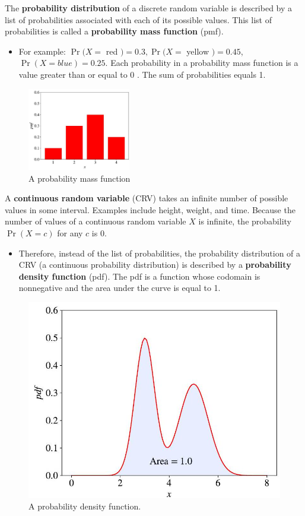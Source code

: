 \documentclass[9pt,dvipsnames]{beamer}
\begin{document}
\begin{frame}
	The \textbf{probability distribution} of a discrete random variable is described by a list of probabilities associated with each of its possible values. This list of probabilities is called a \textbf{probability mass function} (pmf).
	\begin{itemize}
		\item For example: $\operatorname{Pr}(X=$ red $)=0.3, \operatorname{Pr}(X=$ yellow $)=0.45$, $\operatorname{Pr}(X=b l u e)=0.25$. Each probability in a probability mass function is a value greater than or equal to 0 . The sum of probabilities equals 1.
	\end{itemize}

	\begin{figure}
		\centering
		\includegraphics[width=0.4\textwidth]{imgs/notation_3.jpeg}
		\caption{A probability mass function}
	\end{figure}
\end{frame}

\begin{frame}
	A \textbf{continuous random variable} (CRV) takes an infinite number of possible values in some interval. Examples include height, weight, and time. Because the number of values of a continuous random variable $X$ is infinite, the probability $\operatorname{Pr}(X=c)$ for any $c$ is 0.
	\begin{itemize}
		\item Therefore, instead of the list of probabilities, the probability distribution of a CRV (a continuous probability distribution) is described by a \textbf{probability density function} (pdf). The pdf is a function whose codomain is nonnegative and the area under the curve is equal to 1.
	\end{itemize}
	\begin{figure}[ht]
		\centering
		\includegraphics[width=0.4\linewidth]{imgs/notation_4.jpeg}
		\caption{A probability density function.}
	\end{figure}
\end{frame}
\end{document}
